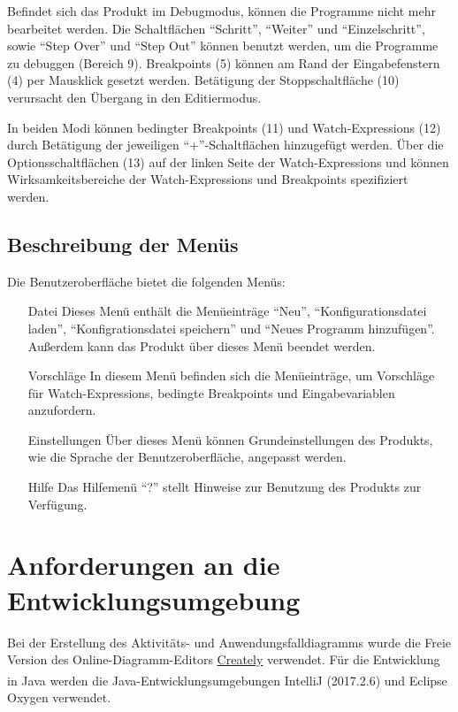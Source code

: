 \documentclass[parskip=full]{scrartcl}
\let\glsplgen\glsuseri
\begin{document}
        Befindet sich das Produkt im \gls{Debugmodus}, können die Programme nicht mehr
        bearbeitet werden.
        Die Schaltflächen \enquote{Schritt}, \enquote{Weiter} und \enquote{Einzelschritt}, sowie \enquote{Step Over} und \enquote{Step Out} können
        benutzt werden, um die Programme zu debuggen (Bereich 9). \glspl{Breakpoint} (5) können am Rand der Eingabefenstern (4) per Mausklick gesetzt werden.
        Betätigung der Stoppschaltfläche (10) verursacht den Übergang in den Editiermodus.

        In beiden Modi können \glspl{bedingter Breakpoint} (11) und \glspl{Watch-Expression} (12) durch Betätigung der jeweiligen 
        \enquote{+}-Schaltflächen hinzugefügt werden. Über die Optionsschaltflächen (13) auf der linken Seite der \glspl{Watch-Expression} und \glsplgen{bedingter Breakpoint} können Wirksamkeitsbereiche der Watch-Expressions und Breakpoints
        spezifiziert werden.\\
     \subsection{Beschreibung der Menüs}
     Die Benutzeroberfläche bietet die folgenden Menüs:
     \begin{itemize}
     \item[Datei] Dieses Menü enthält die Menüeinträge \enquote{Neu}, \enquote{Konfigurationsdatei laden}, \enquote{Konfigrationsdatei speichern} und \enquote{Neues Programm hinzufügen}. Außerdem kann das Produkt über dieses Menü beendet werden.
     \item[Vorschläge] In diesem Menü befinden sich die Menüeinträge, um Vorschläge für Watch-Expressions, bedingte Breakpoints und Eingabevariablen anzufordern.
     \item[Einstellungen] Über dieses Menü können Grundeinstellungen des Produkts, wie die Sprache der Benutzeroberfläche, angepasst werden.
     \item[Hilfe] Das Hilfemenü \enquote{?} stellt Hinweise zur Benutzung des Produkts zur Verfügung.
     \end{itemize}
       
\section{Anforderungen an die Entwicklungsumgebung}
Bei der Erstellung des Aktivitäts- und Anwendungsfalldiagramms wurde die Freie Version des Online-Diagramm-Editors \href{https://creately.com/}{Creately} verwendet.
Für die Entwicklung in Java werden die Java-Entwicklungsumgebungen IntelliJ\textsuperscript{\textcopyright} (2017.2.6) und Eclipse\textsuperscript{\textcopyright} Oxygen verwendet.
\end{document}

